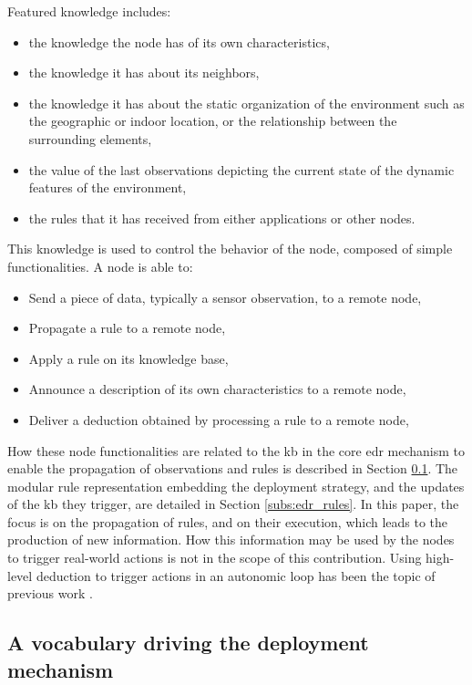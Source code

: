 \documentclass[sw]{iosart2x}
\begin{document}
Featured knowledge includes:
\begin{itemize}
	\item the knowledge the node has of its own characteristics,
	\item the knowledge it has about its neighbors,
	\item the knowledge it has about the static organization of the environment such as the geographic or indoor location, or the relationship between the surrounding elements,
	\item the value of the last observations depicting the current state of the dynamic features of the environment,
	\item the rules that it has received from either applications or other nodes.
\end{itemize}

This knowledge is used to control the behavior of the node, composed of simple functionalities.
A node is able to:
\begin{itemize}
	\item Send a piece of data, typically a sensor observation, to a remote node,
	\item Propagate a rule to a remote node,
	\item Apply a rule on its knowledge base,
	\item Announce a description of its own characteristics to a remote node,
	\item Deliver a deduction obtained by processing a rule to a remote node, 
\end{itemize}

How these node functionalities are related to the \gls{kb} in the core \gls{edr} mechanism to enable the propagation of observations and rules is described in Section \textsection \ref{subs:edr_vocabulary}.
The modular rule representation embedding the deployment strategy, and the updates of the \gls{kb} they trigger, are detailed in Section \textsection \ref{subs:edr_rules}.
In this paper, the focus is on the propagation of rules, and on their execution, which leads to the production of new information. 
How this information may be used by the nodes to trigger real-world actions is not in the scope of this contribution. 
Using high-level deduction to trigger actions in an autonomic loop has been the topic of previous work \cite{Seydoux2016}.

\subsection{A vocabulary driving the deployment mechanism}
\label{subs:edr_vocabulary}
\end{document}
